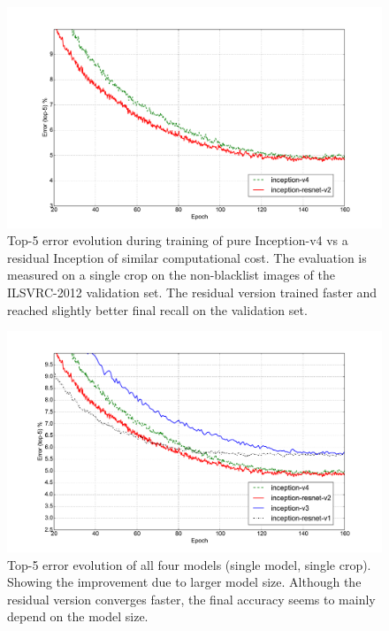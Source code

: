 \begin{figure}
\centering
\includegraphics[width=\linewidth]{wide_top5}
\caption{Top-5 error evolution during training of pure Inception-v4 vs a
  residual Inception of similar computational cost. The evaluation is measured on
  a single crop on the non-blacklist images of the ILSVRC-2012 validation set.
  The residual version trained faster and reached slightly better final recall
  on the validation set.
}
\label{fig:widetop5}
\end{figure}

\begin{figure}
\centering
\includegraphics[width=\linewidth]{all_top5}
\caption{Top-5 error evolution of all four models (single model, single crop).
  Showing the improvement due to larger model size. Although the residual
  version converges faster, the final accuracy seems to mainly depend on the
  model size.
}
\label{fig:alltop5}
\end{figure}

